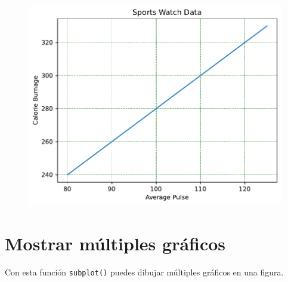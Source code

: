 \begin{code}
\begin{figure}
  \centering
  \includegraphics[scale=0.6]{img/grafica1030.pdf}
\end{figure}
\end{code}

\section{Mostrar múltiples gráficos}

Con esta función \texttt{subplot()} puedes dibujar múltiples gráficos en
una figura.

